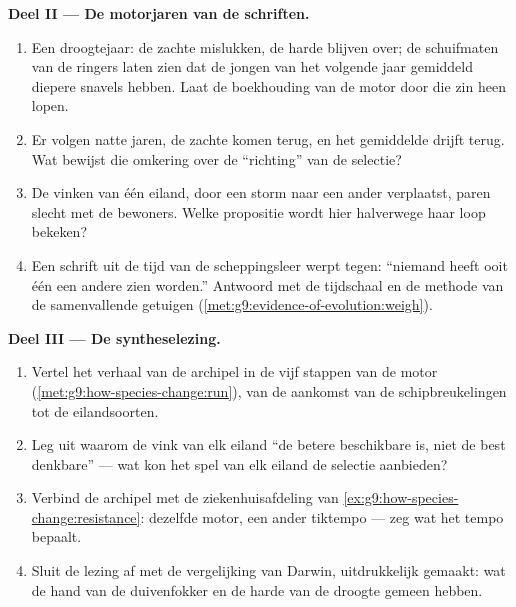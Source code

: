 \begin{problem}
\medskip\noindent\textbf{Deel II --- De motorjaren van de
schriften.}
\begin{enumerate}[resume]
  \item Een droogtejaar: de zachte  mislukken, de harde
        blijven over; de schuifmaten van de ringers laten zien dat
        de jongen van het volgende jaar gemiddeld diepere snavels
        hebben. Laat de boekhouding van de motor door die zin heen
        lopen.
  \item Er volgen natte jaren, de zachte  komen terug, en het
        gemiddelde drijft terug. Wat bewijst die omkering over de
        ``richting'' van de selectie?
  \item De vinken van één eiland, door een storm naar een ander
        verplaatst, paren slecht met de bewoners. Welke propositie
        wordt hier halverwege haar loop bekeken?
  \item Een schrift uit de tijd van de scheppingsleer werpt tegen:
        ``niemand heeft ooit één  een andere zien worden.''
        Antwoord met de tijdschaal en de methode van de
        samenvallende getuigen
        (\cref{met:g9:evidence-of-evolution:weigh}).
\end{enumerate}

\medskip\noindent\textbf{Deel III --- De syntheselezing.}
\begin{enumerate}[resume]
  \item Vertel het verhaal van de archipel in de vijf stappen van
        de motor
        (\cref{met:g9:how-species-change:run}), van de aankomst
        van de schipbreukelingen tot de eilandsoorten.
  \item Leg uit waarom de vink van elk eiland ``de betere
        beschikbare is, niet de best denkbare'' --- wat kon het
        spel van elk eiland de selectie aanbieden?
  \item Verbind de archipel met de ziekenhuisafdeling van
        \cref{ex:g9:how-species-change:resistance}: dezelfde
        motor, een ander tiktempo --- zeg wat het tempo bepaalt.
  \item Sluit de lezing af met de vergelijking van Darwin,
        uitdrukkelijk gemaakt: wat de hand van de duivenfokker en
        de harde  van de droogte gemeen hebben.
\end{enumerate}
\end{problem}
